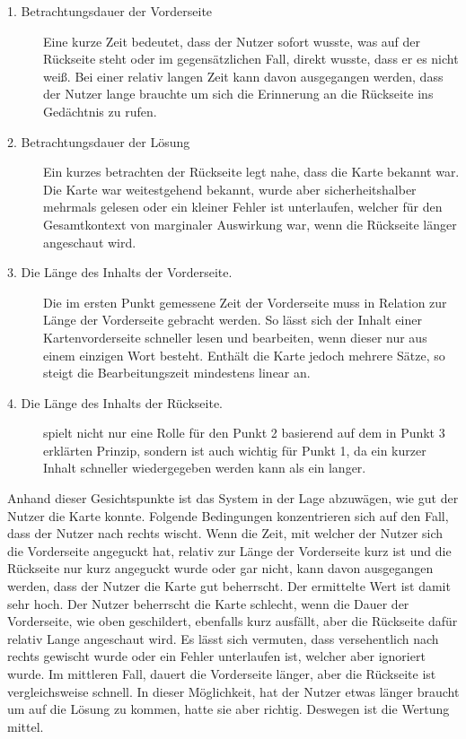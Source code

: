 \begin{description}
\item[1. Betrachtungsdauer der Vorderseite]
Eine kurze Zeit bedeutet, dass der Nutzer sofort wusste, was auf der Rückseite steht oder im gegensätzlichen Fall, direkt wusste, dass er es nicht weiß. Bei einer relativ langen Zeit kann davon ausgegangen werden, dass der Nutzer lange brauchte um sich die Erinnerung an die Rückseite ins Gedächtnis zu rufen.
\item[2. Betrachtungsdauer der Lösung]
Ein kurzes betrachten der Rückseite legt nahe, dass die Karte bekannt war. Die Karte war weitestgehend bekannt, wurde aber sicherheitshalber mehrmals gelesen oder ein kleiner Fehler ist unterlaufen, welcher für den Gesamtkontext von marginaler Auswirkung war, wenn die Rückseite länger angeschaut wird.
\item[3. Die Länge des Inhalts der Vorderseite.]
Die im ersten Punkt gemessene Zeit der Vorderseite muss in Relation zur Länge der Vorderseite gebracht werden. So lässt sich der Inhalt einer Kartenvorderseite schneller lesen und bearbeiten, wenn dieser nur aus einem einzigen Wort besteht. Enthält die Karte jedoch mehrere Sätze, so steigt die Bearbeitungszeit mindestens linear an.
\item[4. Die Länge des Inhalts der Rückseite.]
spielt nicht nur eine Rolle für den Punkt 2 basierend auf dem in Punkt 3 erklärten Prinzip, sondern ist auch wichtig für Punkt 1, da ein kurzer Inhalt schneller wiedergegeben werden kann als ein langer.
\end{description}

Anhand dieser Gesichtspunkte ist das System in der Lage abzuwägen, wie gut der Nutzer die Karte konnte. Folgende Bedingungen konzentrieren sich auf den Fall, dass der Nutzer nach rechts wischt. Wenn die Zeit, mit welcher der Nutzer sich die Vorderseite angeguckt hat, relativ zur Länge der Vorderseite kurz ist und die Rückseite nur kurz angeguckt wurde oder gar nicht, kann davon ausgegangen werden, dass der Nutzer die Karte gut beherrscht. Der ermittelte Wert ist damit sehr hoch. Der Nutzer beherrscht die Karte schlecht, wenn die Dauer der Vorderseite, wie oben geschildert, ebenfalls kurz ausfällt, aber die Rückseite dafür relativ Lange angeschaut wird. Es lässt sich vermuten, dass versehentlich nach rechts gewischt wurde oder ein Fehler unterlaufen ist, welcher aber ignoriert wurde. Im mittleren Fall, dauert die Vorderseite länger, aber die Rückseite ist vergleichsweise schnell. In dieser Möglichkeit, hat der Nutzer etwas länger braucht um auf die Lösung zu kommen, hatte sie aber richtig. Deswegen ist die Wertung mittel.

